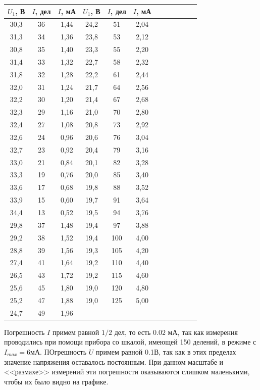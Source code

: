 \documentclass[14pt]{article}
\begin{document}
\begin{center}
\begin{tabular}{|c|c|c|c|c|c|c|c|c|c|c|c|}
\hline
$U_1$, В&$I$, дел&$I$, мА&$U_1$, В&$I$, дел&$I$, мА\\
\hline
30,3&36&1,44&24,2&51&2,04\\
\hline
31,3&34&1,36&23,8&53&2,12\\
\hline
30,8&35&1,40&23,3&55&2,20\\
\hline
31,4&33&1,32&22,7&58&2,32\\
\hline
31,8&32&1,28&22,2&61&2,44\\
\hline
32,0&31&1,24&21,7&64&2,56\\
\hline
32,2&30&1,20&21,4&67&2,68\\
\hline
32,3&29&1,16&21,0&70&2,80\\
\hline
32,4&27&1,08&20,8&73&2,92\\
\hline
32,6&24&0,96&20,6&76&3,04\\
\hline
32,7&23&0,92&20,4&79&3,16\\
\hline
33,0&21&0,84&20,1&82&3,28\\
\hline
33,3&19&0,76&20,0&85&3,40\\
\hline
33,6&17&0,68&19,8&88&3,52\\
\hline
33,9&15&0,60&19,7&91&3,64\\
\hline
34,4&13&0,52&19,5&94&3,76\\
\hline
29,8&37&1,48&19,4&97&3,88\\
\hline
29,2&38&1,52&19,4&100&4,00\\
\hline
28,8&39&1,56&19,3&105&4,20\\
\hline
27,4&41&1,64&19,2&110&4,40\\
\hline
26,5&43&1,72&19,2&115&4,60\\
\hline
25,6&45&1,80&19,0&120&4,80\\
\hline
25,2&47&1,88&19,0&125&5,00\\
\hline
24,7&49&1,96&&&\\
\hline
\end{tabular}
\end{center}

\vspace{1cm}
Погрешность $I$ примем равной $1/2$ дел, то есть $0.02$ мА, так как измерения проводились при помощи прибора со шкалой, имеющей 150 делений, в режиме с $I_{max} = 6$мА. ПОгрешность $U$ примем равной 0.1В, так как в этих пределах значение напряжения оставалось постоянным. При данном масштабе и <<размахе>> измерений эти погрешности оказываются слишком маленькими, чтобы их было видно на графике.
\end{document}
